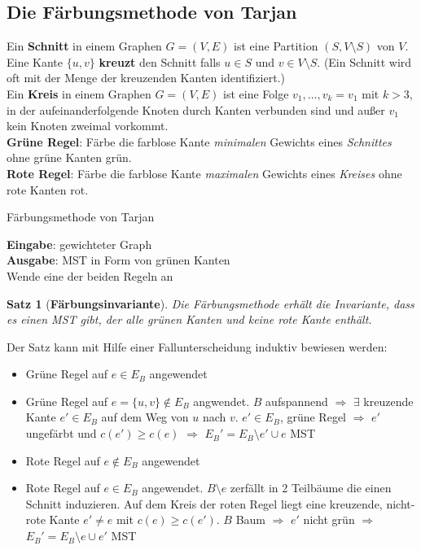 \documentclass[a4paper,10pt]{scrartcl}
\newcommand{\tbf}{\textbf}
\newcommand{\Ra}{\Rightarrow}
\newcommand{\Gr}{$G = (V,E)$ }
\newcommand{\Cut}{$(S,V \setminus S)$ }
\newcommand{\Eingabe}[1]{\STATE \tbf{Eingabe}: #1 \\}
\newcommand{\Ausgabe}[1]{\STATE \tbf{Ausgabe}: #1 \\}
\newtheorem{satz}{Satz}
\begin{document}
\subsection{Die Färbungsmethode von \textsf{Tarjan}}
Ein \tbf{Schnitt} in einem Graphen \Gr ist eine Partition \Cut von $V$. \\

Eine Kante $\{u,v\}$ \tbf{kreuzt} den Schnitt falls $u \in S$ und $v \in V \setminus S$. (Ein Schnitt wird oft mit der Menge der kreuzenden Kanten identifiziert.) \\

Ein \tbf{Kreis} in einem Graphen \Gr ist eine Folge $v_1, \ldots, v_k = v_1$ mit $k > 3$, in der aufeinanderfolgende Knoten durch Kanten verbunden sind und außer $v_1$ kein Knoten zweimal vorkommt. \\

\tbf{Grüne Regel}: Färbe die farblose Kante \textit{minimalen} Gewichts eines \textit{Schnittes} ohne grüne Kanten grün. \\

\tbf{Rote Regel}: Färbe die farblose Kante \textit{maximalen} Gewichts eines \textit{Kreises} ohne rote Kanten rot. \\

\begin{algorithm}
\caption{Färbungsmethode von \textsf{Tarjan}}
\begin{algorithmic}
\Eingabe{gewichteter Graph}
\Ausgabe{MST in Form von grünen Kanten}
	\STATE Wende eine der beiden Regeln an
\ENDWHILE
\end{algorithmic}
\end{algorithm}

\begin{satz}[\tbf{Färbungsinvariante}]
 Die Färbungsmethode erhält die Invariante, dass es einen MST gibt, der alle grünen Kanten und keine rote Kante enthält.
\end{satz}

Der Satz kann mit Hilfe einer Fallunterscheidung induktiv bewiesen werden:
\begin{itemize}
 \item Grüne Regel auf $e \in E_B$ angewendet \checkmark
 \item Grüne Regel auf $e = \{u,v\} \not \in E_B$ angwendet. $B$ aufspannend $\Ra$ $\exists$ kreuzende Kante $e' \in E_B$ auf dem Weg von $u$ nach $v$. $e' \in E_B$, grüne Regel $\Ra$ $e'$ ungefärbt und $c(e') \geq c(e)$ $\Ra$ $E_B' = E_B \setminus e' \cup e$ MST \checkmark
 \item Rote Regel auf $e \not \in E_B$ angewendet \checkmark
 \item Rote Regel auf $e \in E_B$ angewendet. $B \setminus e$ zerfällt in 2 Teilbäume die einen Schnitt induzieren. Auf dem Kreis der roten Regel liegt eine kreuzende, nicht-rote Kante $e' \not = e$ mit $c(e) \geq c(e')$. $B$ Baum $\Ra$ $e'$ nicht grün $\Ra$ $E_B' = E_B \setminus e \cup e'$ MST \checkmark
\end{itemize}
 
\end{document}
